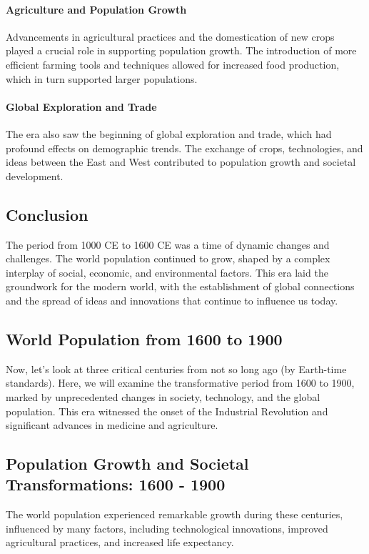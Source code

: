 \documentclass{book}
\begin{document}
\paragraph{Agriculture and Population Growth}
Advancements in agricultural practices and the domestication of new crops played a crucial role in supporting population growth. The introduction of more efficient farming tools and techniques allowed for increased food production, which in turn supported larger populations.

\paragraph{Global Exploration and Trade}
The era also saw the beginning of global exploration and trade, which had profound effects on demographic trends. The exchange of crops, technologies, and ideas between the East and West contributed to population growth and societal development.

\subsection*{Conclusion}
The period from 1000 CE to 1600 CE was a time of dynamic changes and challenges. The world population continued to grow, shaped by a complex interplay of social, economic, and environmental factors. This era laid the groundwork for the modern world, with the establishment of global connections and the spread of ideas and innovations that continue to influence us today.

\subsection*{World Population from 1600 to 1900}
Now, let's look at three critical centuries from not so long ago (by Earth-time standards). Here, we will examine the transformative period from 1600 to 1900, marked by unprecedented changes in society, technology, and the global population. This era witnessed the onset of the Industrial Revolution and significant advances in medicine and agriculture.

\subsection*{Population Growth and Societal Transformations: 1600 - 1900}
The world population experienced remarkable growth during these centuries, influenced by many factors, including technological innovations, improved agricultural practices, and increased life expectancy.
\end{document}
